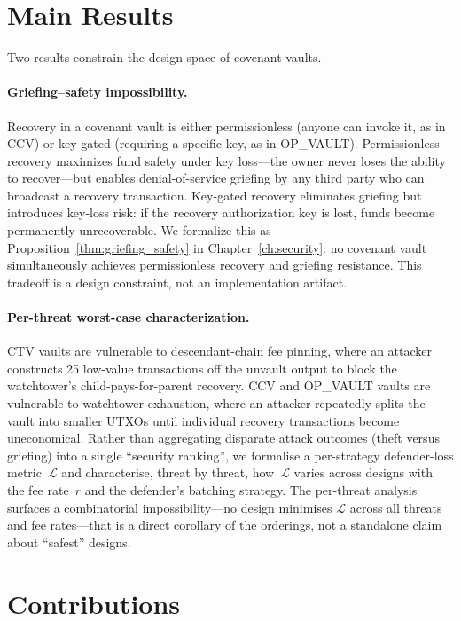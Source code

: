 \section{Main Results} \label{se:main_results}

Two results constrain the design space of covenant vaults.

\paragraph{Griefing--safety impossibility.}
Recovery in a covenant vault is either permissionless (anyone can invoke it, as in CCV)
or key-gated (requiring a specific key, as in OP\_VAULT). Permissionless recovery
maximizes fund safety under key loss---the owner never loses the ability to recover---but
enables denial-of-service griefing by any third party who can broadcast a recovery
transaction. Key-gated recovery eliminates griefing but introduces key-loss risk: if the
recovery authorization key is lost, funds become permanently unrecoverable. We formalize
this as Proposition~\ref{thm:griefing_safety} in Chapter~\ref{ch:security}: no covenant vault
simultaneously achieves permissionless recovery and griefing resistance. This tradeoff is
a design constraint, not an implementation artifact.

\paragraph{Per-threat worst-case characterization.}
CTV vaults are vulnerable to descendant-chain fee pinning, where an attacker constructs
25 low-value transactions off the unvault output to block the watchtower's
child-pays-for-parent recovery. CCV and OP\_VAULT vaults are vulnerable to watchtower
exhaustion, where an attacker repeatedly splits the vault into smaller UTXOs until
individual recovery transactions become uneconomical. Rather than aggregating
disparate attack outcomes (theft versus griefing) into a single ``security ranking'',
we formalise a per-strategy defender-loss metric~$\mathcal{L}$ and characterise, threat
by threat, how~$\mathcal{L}$ varies across designs with the fee rate~$r$ and the
defender's batching strategy. The per-threat analysis surfaces a combinatorial
impossibility---no design minimises $\mathcal{L}$ across all threats and fee
rates---that is a direct corollary of the orderings, not a standalone claim about
``safest'' designs.

\section{Contributions} \label{se:contributions}

